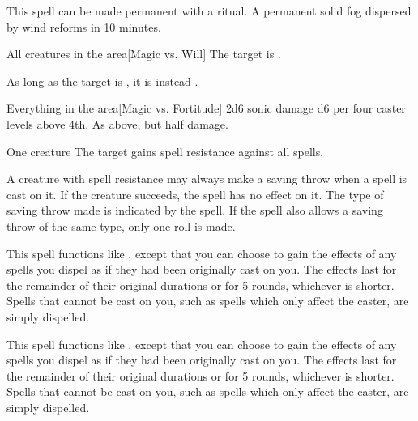 This spell can be made permanent with a  ritual. A permanent solid fog dispersed by wind reforms in 10 minutes.

\begin{spelltarget}{All creatures in the area}[Magic vs. Will]
    \spellsuccess The target is \bewildered.

    As long as the target is \bloodied, it is instead \confused.
\end{spelltarget}

\begin{spelltarget}{Everything in the area}[Magic vs. Fortitude]
    \spellsuccess 2d6 sonic damage \add d6 per four caster levels above 4th.
    \spellfailure As above, but half damage.
\end{spelltarget}

\spellrng{\rngclose}
\spelldur{\durshort}
\begin{spelltarget}{One creature}
    \spelleffect The target gains spell resistance against all spells.
\end{spelltarget}
\spellnotes A creature with spell resistance may always make a saving throw when a spell is cast on it. If the creature succeeds, the spell has no effect on it. The type of saving throw made is indicated by the spell. If the spell also allows a saving throw of the same type, only one roll is made.

\spellspecial This spell functions like , except that you can choose to gain the effects of any spells you dispel as if they had been originally cast on you. The effects last for the remainder of their original durations or for 5 rounds, whichever is shorter. Spells that cannot be cast on you, such as spells which only affect the caster, are simply dispelled.

\spellspecial This spell functions like , except that you can choose to gain the effects of any spells you dispel as if they had been originally cast on you. The effects last for the remainder of their original durations or for 5 rounds, whichever is shorter. Spells that cannot be cast on you, such as spells which only affect the caster, are simply dispelled.

